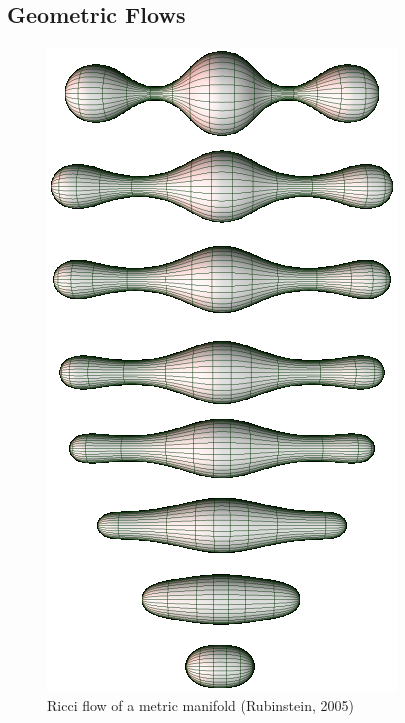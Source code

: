 \documentclass{article}
\begin{document}
\subsection{Geometric Flows}
    
    \begin{figure}
        \vspace{0.3cm}
        \centering
        \includegraphics[scale=0.3]{ricci-flow.png}
        \\ Ricci flow of a metric manifold (Rubinstein, 2005)
    \end{figure}
    
\end{document}
